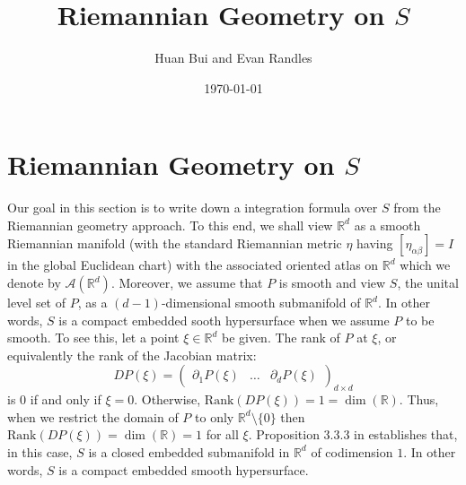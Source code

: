 \documentclass{article}
\author{Huan Bui and Evan Randles}
\title{Riemannian Geometry on $S$}
\date{\today}
\newcommand{\p}{\partial}
\newcommand{\R}{\mathbb{R}}
\theoremstyle{theorem}
\begin{document}
\maketitle

\section{Riemannian Geometry on $S$}

Our goal in this section is to write down a integration formula over $S$ from the Riemannian geometry approach. To this end, we shall view $\mathbb{R}^d$ as a smooth Riemannian manifold (with the standard Riemannian metric $\eta$ having $[\eta_{\alpha\beta}]=I$ in the global Euclidean chart) with the associated oriented atlas on $\mathbb{R}^d$ which we denote by $\mathcal{A}(\mathbb{R}^d)$. Moreover, we assume that $P$ is smooth and view $S$, the unital level set of $P$, as a $(d-1)$-dimensional smooth submanifold of $\R^d$. In other words, $S$ is a compact embedded sooth hypersurface when we assume $P$ to be smooth. To see this, let a point $\xi\in \R^d$ be given. The rank of $P$ at $\xi$, or equivalently the rank of the Jacobian matrix:
\begin{equation*}
    DP(\xi) = \begin{pmatrix}
    \p_1 P(\xi) & \dots & \p_{d} P(\xi)
    \end{pmatrix}_{ d \times d}
\end{equation*}
is $0$ if and only if $\xi = 0$. Otherwise, $\text{Rank}(DP(\xi)) = 1 = \dim(\R)$. Thus, when we restrict the domain of $P$ to only $\R^d \setminus \{ 0\}$ then $\text{Rank}(DP(\xi)) = \dim(\R) = 1$ for all $\xi$. Proposition 3.3.3 in \cite{absil2009optimization} establishes that, in this case, $S$ is a closed embedded submanifold in $\R^d$ of codimension $1$. In other words, $S$ is a compact embedded smooth hypersurface.
\end{document}
